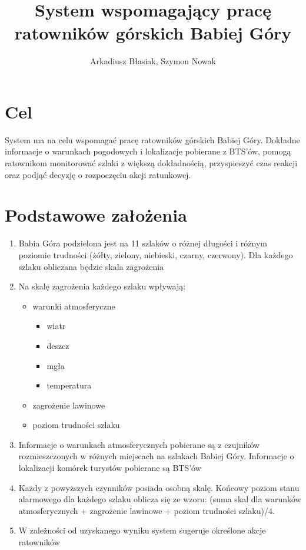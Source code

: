 \documentclass[a4paper,12pt]{article}
\title{System wspomagający pracę ratowników górskich Babiej Góry}
\author{Arkadiusz Błasiak, Szymon Nowak}
\date{}
\begin{document}
\maketitle
\newpage
\section{Cel}
System ma na celu wspomagać pracę ratowników górskich Babiej Góry. Dokładne informacje o warunkach pogodowych i lokalizacje pobierane z BTS’ów, pomogą ratownikom monitorować szlaki z większą dokładnością, przyspieszyć czas reakcji oraz podjąć decyzję o rozpoczęciu akcji ratunkowej.
\section{Podstawowe założenia}
\begin{enumerate}
\item Babia Góra podzielona jest na 11 szlaków o różnej długości i różnym poziomie trudności (żółty, zielony, niebieski, czarny, czerwony). Dla każdego szlaku obliczana będzie skala zagrożenia
\item Na skalę zagrożenia każdego szlaku wpływają:
\begin{itemize}
\item warunki atmosferyczne
\begin{itemize}
\item wiatr
\item deszcz
\item mgła
\item temperatura
\end{itemize}
\item zagrożenie lawinowe
\item poziom trudności szlaku
\end{itemize}
\item Informacje o warunkach atmosferycznych pobierane są z czujników rozmieszczonych w różnych miejscach na szlakach Babiej Góry. Informacje o lokalizacji komórek turystów pobierane są BTS’ów
\item Każdy z powyższych czynników posiada osobną skalę. Końcowy poziom stanu alarmowego dla każdego szlaku oblicza się ze wzoru: (suma skal dla warunków atmosferycznych + zagrożenie lawinowe + poziom trudności szlaku)/4.
\item W zależności od uzyskanego wyniku system sugeruje określone akcje ratowników
\end{enumerate}
\newpage
\end{document}
